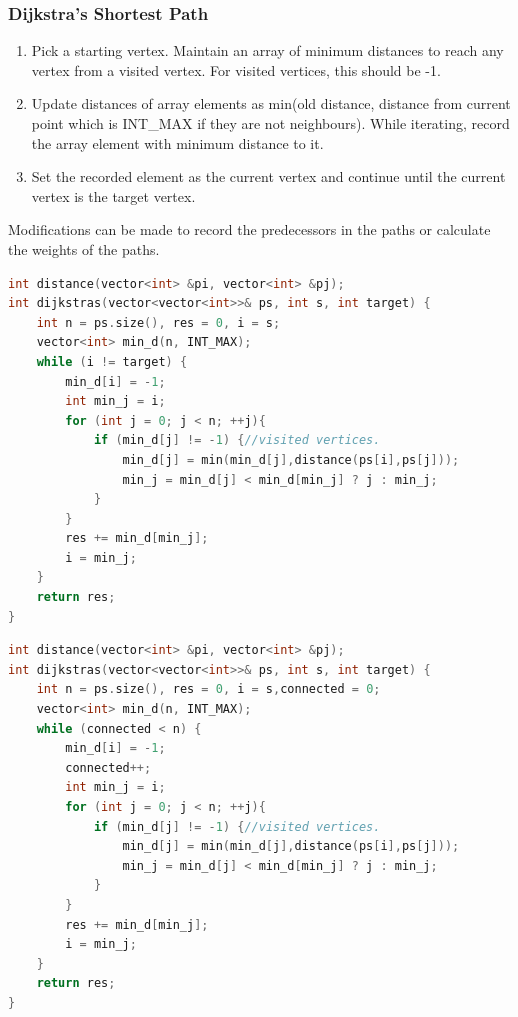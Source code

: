\documentclass{report}
\begin{document}
\subsubsection*{Dijkstra's Shortest Path}
\begin{enumerate}
    \item Pick a starting vertex. Maintain an array of minimum distances to reach any vertex from a visited vertex. For visited vertices, this should be -1.
    \item Update distances of array elements as min(old distance, distance from current point which is INT\_MAX if they are not neighbours). While iterating, record the array element with minimum distance to it. 
    \item Set the recorded element as the current vertex and continue until the current vertex is the target vertex.
\end{enumerate}
Modifications can be made to record the predecessors in the paths
or calculate the weights of the paths.
\begin{lstlisting}[language=C++,caption=Shortest Path]
int distance(vector<int> &pi, vector<int> &pj);
int dijkstras(vector<vector<int>>& ps, int s, int target) {
    int n = ps.size(), res = 0, i = s;
    vector<int> min_d(n, INT_MAX);
    while (i != target) {
        min_d[i] = -1;
        int min_j = i;
        for (int j = 0; j < n; ++j){
            if (min_d[j] != -1) {//visited vertices.
                min_d[j] = min(min_d[j],distance(ps[i],ps[j]));
                min_j = min_d[j] < min_d[min_j] ? j : min_j;
            }
        }
        res += min_d[min_j];
        i = min_j;
    }
    return res;
}
\end{lstlisting}
\begin{lstlisting}[language=C++,caption=Dijkstra's MST]
int distance(vector<int> &pi, vector<int> &pj);
int dijkstras(vector<vector<int>>& ps, int s, int target) {
    int n = ps.size(), res = 0, i = s,connected = 0;
    vector<int> min_d(n, INT_MAX);
    while (connected < n) {
        min_d[i] = -1;
        connected++;
        int min_j = i;
        for (int j = 0; j < n; ++j){
            if (min_d[j] != -1) {//visited vertices.
                min_d[j] = min(min_d[j],distance(ps[i],ps[j]));
                min_j = min_d[j] < min_d[min_j] ? j : min_j;
            }
        }
        res += min_d[min_j];
        i = min_j;
    }
    return res;
}
\end{lstlisting}
\end{document}
